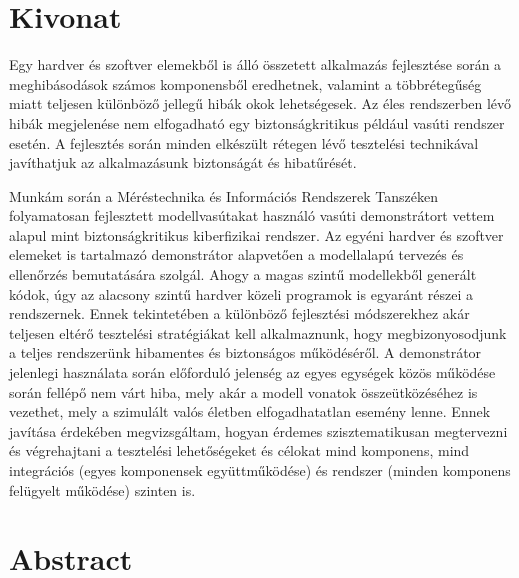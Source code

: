 \setcounter{page}{1}

\selecthungarian

\chapter*{Kivonat}

Egy hardver és szoftver elemekből is álló összetett alkalmazás fejlesztése során a meghibásodások számos komponensből eredhetnek, valamint a többrétegűség miatt teljesen különböző jellegű hibák okok lehetségesek. Az éles rendszerben lévő hibák megjelenése nem elfogadható egy biztonságkritikus például vasúti rendszer esetén. A fejlesztés során minden elkészült rétegen lévő tesztelési technikával javíthatjuk az alkalmazásunk biztonságát és hibatűrését.

Munkám során a Méréstechnika és Információs Rendszerek Tanszéken folyamatosan fejlesztett modellvasútakat használó vasúti demonstrátort vettem alapul mint biztonságkritikus kiberfizikai rendszer. Az egyéni hardver és szoftver elemeket is tartalmazó demonstrátor alapvetően a modellalapú tervezés és ellenőrzés bemutatására szolgál. Ahogy a magas szintű modellekből generált kódok, úgy az alacsony szintű hardver közeli programok is egyaránt részei a rendszernek. Ennek tekintetében a különböző fejlesztési módszerekhez akár teljesen eltérő tesztelési stratégiákat kell alkalmaznunk, hogy megbizonyosodjunk a teljes rendszerünk hibamentes és biztonságos működéséről. A demonstrátor jelenlegi használata során előforduló jelenség az egyes egységek közös működése során fellépő nem várt hiba, mely akár a modell vonatok összeütközéséhez is vezethet, mely a szimulált valós életben elfogadhatatlan esemény lenne. Ennek javítása érdekében megvizsgáltam, hogyan érdemes szisztematikusan megtervezni és végrehajtani a tesztelési lehetőségeket és célokat mind komponens, mind integrációs (egyes komponensek együttműködése)  és rendszer (minden komponens felügyelt működése) szinten is.

\vfill
\selectenglish


\chapter*{Abstract}

